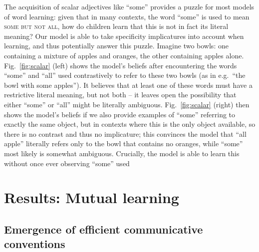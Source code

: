 \documentclass{article} %
\begin{document}
The acquisition of scalar adjectives like ``some'' provides a puzzle for most models of word learning: given that in many contexts, the word ``some'' is used to mean \textsc{some but not all}, how do children learn that this is not in fact its literal meaning? Our model is able to take specificity implicatures into account when learning, and thus potentially answer this puzzle. Imagine two bowls: one containing a mixture of apples and oranges, the other containing apples alone. Fig.~\ref{fig:scalar} (left) shows the model's beliefs after encountering the words ``some'' and ``all'' used contrastively to refer to these two bowls (as in e.g.\ ``the bowl with some apples''). It believes that at least one of these words must have a restrictive literal meaning, but not both -- it leaves open the possibility that either ``some'' or ``all'' might be literally ambiguous. Fig.~\ref{fig:scalar} (right) then shows the model's beliefs if we also provide examples of ``some'' referring to exactly the same object, but in contexts where this is the only object available, so there is no contrast and thus no implicature; this convinces the model that ``all apple'' literally refers only to the bowl that contains no oranges, while ``some'' most likely is somewhat ambiguous. Crucially, the model is able to learn this without once ever observing ``some'' used 

\section{Results: Mutual learning}

\subsection{Emergence of efficient communicative conventions}
\end{document}

